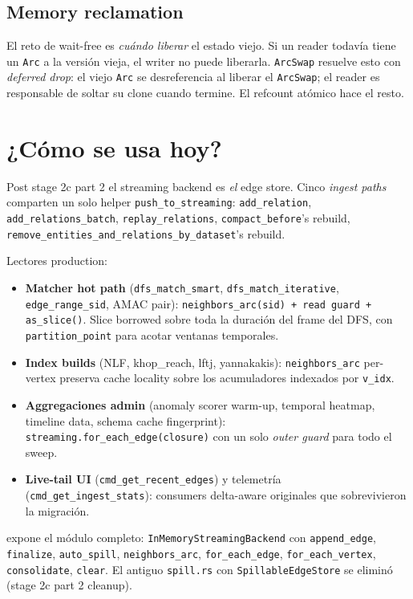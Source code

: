 \subsection{Memory reclamation}

El reto de wait-free es \emph{cuándo liberar} el estado viejo. Si
un reader todavía tiene un \texttt{Arc} a la versión vieja, el
writer no puede liberarla. \texttt{ArcSwap} resuelve esto con
\emph{deferred drop}: el viejo \texttt{Arc} se desreferencia al
liberar el \texttt{ArcSwap}; el reader es responsable de soltar su
clone cuando termine. El refcount atómico hace el resto.

\section{¿Cómo se usa hoy?}

Post stage 2c part 2 el streaming backend es \emph{el} edge store.
Cinco \emph{ingest paths} comparten un solo helper
\texttt{push\_to\_streaming}: \texttt{add\_relation},
\texttt{add\_relations\_batch}, \texttt{replay\_relations},
\texttt{compact\_before}'s rebuild,
\texttt{remove\_entities\_and\_relations\_by\_dataset}'s rebuild.

Lectores production:

\begin{itemize}
    \item \textbf{Matcher hot path} (\texttt{dfs\_match\_smart},
    \texttt{dfs\_match\_iterative}, \texttt{edge\_range\_sid},
    AMAC pair): \texttt{neighbors\_arc(sid) + read guard +
    as\_slice()}. Slice borrowed sobre toda la duración del frame
    del DFS, con \texttt{partition\_point} para acotar ventanas
    temporales.
    \item \textbf{Index builds} (NLF, khop\_reach, lftj,
    yannakakis): \texttt{neighbors\_arc} per-vertex preserva cache
    locality sobre los acumuladores indexados por \texttt{v\_idx}.
    \item \textbf{Aggregaciones admin} (anomaly scorer warm-up,
    temporal heatmap, timeline data, schema cache fingerprint):
    \texttt{streaming.for\_each\_edge(closure)} con un solo
    \emph{outer guard} para todo el sweep.
    \item \textbf{Live-tail UI} (\texttt{cmd\_get\_recent\_edges})
    y telemetría (\texttt{cmd\_get\_ingest\_stats}): consumers
    delta-aware originales que sobrevivieron la migración.
\end{itemize}

\begin{enelcodigo}
 expone el módulo
completo: \texttt{InMemoryStreamingBackend} con
\texttt{append\_edge}, \texttt{finalize}, \texttt{auto\_spill},
\texttt{neighbors\_arc}, \texttt{for\_each\_edge},
\texttt{for\_each\_vertex}, \texttt{consolidate}, \texttt{clear}.
El antiguo \texttt{spill.rs} con \texttt{SpillableEdgeStore} se
eliminó (stage 2c part 2 cleanup).
\end{enelcodigo}

